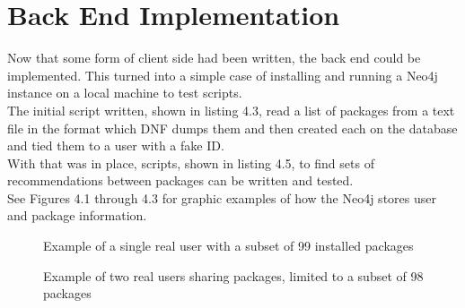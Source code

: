 \documentclass{l4proj}
\begin{document}
\section{Back End Implementation}
Now that some form of client side had been written, the back end could be implemented. This turned into a simple case of installing and running a Neo4j instance on a local machine to test scripts.\\
The initial script written, shown in listing 4.3, read a list of packages from a text file in the format which DNF dumps them and then created each on the database and tied them to a user with a fake ID.\\
With that was in place, scripts, shown in listing 4.5, to find sets of recommendations between packages can be written and tested.\\
See Figures 4.1 through 4.3 for graphic examples of how the Neo4j stores user and package information.\\
\begin{figure}
\caption{Example of a single real user with a subset of 99 installed packages}
\end{figure}
\begin{figure}
\caption{Example of two real users sharing packages, limited to a subset of 98 packages}
\end{figure}
\end{document}
